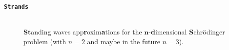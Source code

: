 
\begin{center}
    \begin{minipage}{.8\textwidth}
        \begin{description}
            \item[\textbf{\texttt{Strands}}] \hfill\\ \textbf{St}anding waves app\textbf{r}oxim\textbf{a}tions for the $\bm{n}$-\textbf{d}imensional \textbf{S}chrödinger problem (with $n = 2$ and maybe in the future $n = 3$).
        \end{description}
    \end{minipage}
\end{center}





